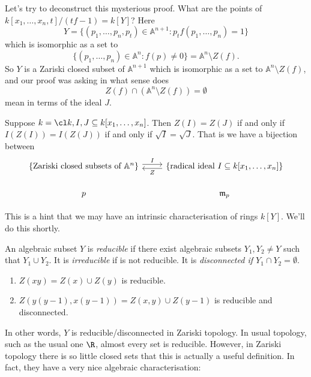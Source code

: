 \documentclass[a4paper]{article}
\renewcommand{\A}{\mathbb{A}}
\begin{document}
\begin{remark}
  Let's try to deconstruct this mysterious proof. What are the points of \(k[x_1, \dots, x_n, t]/(tf - 1) = k[Y]\)? Here
  \[
    Y = \{(p_1, \dots, p_n, p_t) \in \A^{n + 1}: p_t f(p_1, \dots, p_n) = 1\}
  \]
  which is isomorphic as a set to
  \[
    \{(p_1, \dots, p_n) \in \A^n: f(p) \neq 0\} = \A^n \setminus Z(f).
  \]
  So \(Y\) is a Zariski closed subset of \(\A^{n + 1}\) which is isomorphic as a set to \(\A^n \setminus Z(f)\), and our proof was asking in what sense does
  \[
    Z(f) \cap (\A^n \setminus Z(f)) = \emptyset
  \]
  mean in terms of the ideal \(J\).
\end{remark}

\begin{corollary}
  Suppose \(k = \cl k, I, J \subseteq k[x_1, \dots, x_n]\). Then \(Z(I) = Z(J)\) if and only if \(I(Z(I)) = I(Z(J))\) if and only if \(\sqrt I = \sqrt J\). That is we have a bijection between
  \[
    \begin{tikzcd}
      \{\text{Zariski closed subsets of } \A^n\} \ar[r, "I", shift left] & \{\text{radical ideal } I \subseteq k[x_1, \dots, x_n]\} \ar[l, "Z", shift left] \\
      p & \mathfrak m_p
    \end{tikzcd}
  \]
\end{corollary}

This is a hint that we may have an intrinsic characterisation of rings \(k[Y]\). We'll do this shortly.

\begin{definition}
  An algebraic subset \(Y\) is \emph{reducible} if there exist algebraic subsets \(Y_1, Y_2 \neq Y\) such that \(Y_1 \cup Y_2\). It is \emph{irreducible} if is not reducible. It is \emph{disconnected if \(Y_1 \cap Y_2 = \emptyset\)}.
\end{definition}

\begin{eg}\leavevmode
  \begin{enumerate}
  \item \(Z(xy) = Z(x) \cup Z(y)\) is reducible.
  \item \(Z(y(y - 1), x(y - 1)) = Z(x, y) \cup Z(y - 1)\) is reducible and disconnected.
  \end{enumerate}
\end{eg}

In other words, \(Y\) is reducible/disconnected in Zariski topology. In usual topology, such as the usual one \(\R\), almost every set is reducible. However, in Zariski topology there is so little closed sets that this is actually a useful definition. In fact, they have a very nice algebraic characterisation:
\end{document}
